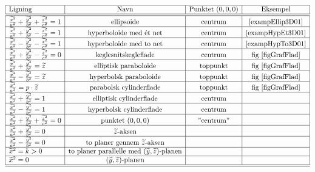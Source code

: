 \begin{equation*} \label{eqAndenGrad3D}
\begin{array}{|l|c|c|c|}
  \hline
 \textrm{Ligning} & \textrm{Navn} & \textrm{Punktet $(0,0,0)$} & \textrm{Eksempel} \\ \hline \hline
  \frac{\widetilde{x}^{2}}{a^{2}} +  \frac{\widetilde{y}^{2}}{b^{2}} +   \frac{\widetilde{z}^{2}}{c^{2}} =1  & \textrm{ellipsoide} & \textrm{centrum} & \textrm{\ref{exampEllip3D01}} \\ \hline
  \frac{\widetilde{x}^{2}}{a^{2}} +  \frac{\widetilde{y}^{2}}{b^{2}} -  \frac{\widetilde{z}^{2}}{c^{2}} =1 & \textrm{hyperboloide med \'{e}t net} & \textrm{centrum} & \textrm{\ref{exampHypEt3D01}}\\ \hline
     \frac{\widetilde{x}^{2}}{a^{2}} - \frac{\widetilde{y}^{2}}{b^{2}} -   \frac{\widetilde{z}^{2}}{c^{2}} =1 & \textrm{hyperboloide med to net} & \textrm{centrum} & \textrm{\ref{exampHypTo3D01}}\\ \hline
  \frac{\widetilde{x}^{2}}{a^{2}} +  \frac{\widetilde{y}^{2}}{b^{2}} -   \frac{\widetilde{z}^{2}}{c^{2}} =0 & \textrm{keglesnitskegleflade} & \textrm{centrum} & \textrm{fig \ref{figGrafFlad}}\\ \hline
    \frac{\widetilde{x}^{2}}{a^{2}} +  \frac{\widetilde{y}^{2}}{b^{2}}  = \widetilde{z} & \textrm{elliptisk paraboloide} & \textrm{toppunkt}&  \textrm{fig \ref{figGrafFlad}}\\ \hline
   \frac{\widetilde{x}^{2}}{a^{2}} - \frac{\widetilde{y}^{2}}{b^{2}}  = \widetilde{z} & \textrm{hyperbolsk paraboloide} & \textrm{toppunkt}& \textrm{fig \ref{figGrafFlad}} \\ \hline
     \frac{\widetilde{x}^{2}}{a^{2}}= p\cdot \widetilde{z} & \textrm{parabolsk cylinderflade} & \textrm{toppunkt} & \textrm{fig \ref{figGrafFlad}} \\ \hline
 \frac{\widetilde{x}^{2}}{a^{2}} + \frac{\widetilde{y}^{2}}{b^{2}}  = 1 & \textrm{elliptisk cylinderflade} & \textrm{centrum} & \\ \hline
  \frac{\widetilde{x}^{2}}{a^{2}} - \frac{\widetilde{y}^{2}}{b^{2}}  = 1 & \textrm{hyperbolsk cylinderflade} & \textrm{centrum} & \\ \hline
\frac{\widetilde{x}^{2}}{a^{2}} +  \frac{\widetilde{y}^{2}}{b^{2}} +   \frac{\widetilde{z}^{2}}{c^{2}}  = 0 & \textrm{punktet $(0,0,0)$} & \textrm{''centrum''} & \\ \hline
 \frac{\widetilde{x}^{2}}{a^{2}} +  \frac{\widetilde{y}^{2}}{b^{2}}  = 0 & \textrm{$\widetilde{z}$-aksen} &  & \\ \hline
  \frac{\widetilde{x}^{2}}{a^{2}} -  \frac{\widetilde{y}^{2}}{b^{2}}  = 0 & \textrm{to planer gennem $\widetilde{z}$-aksen} &  & \\ \hline
\widetilde{x}^{2} =  k > 0  & \textrm{to planer parallelle med $(\widetilde{y},\widetilde{z})$-planen} &  & \\ \hline
 \widetilde{x}^{2} =  0  & \textrm{$(\widetilde{y},\widetilde{z})$-planen} &  & \\ \hline
 \hline
\end{array}
\end{equation*}
